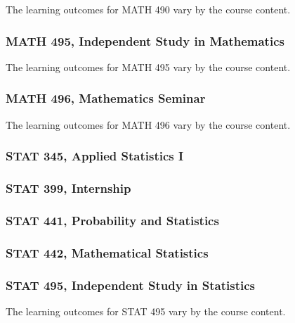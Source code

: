The learning outcomes for MATH 490 vary by the course content.

\subsubsection*{MATH 495, Independent Study in Mathematics}


The learning outcomes for MATH 495 vary by the course content.

\subsubsection*{MATH 496, Mathematics Seminar}

The learning outcomes for MATH 496 vary by the course content.


\subsubsection*{STAT 345, Applied Statistics I}

\subsubsection*{STAT 399, Internship}

\subsubsection*{STAT 441, Probability and Statistics}

\subsubsection*{STAT 442, Mathematical Statistics}

\subsubsection*{STAT 495, Independent Study in Statistics}

The learning outcomes for STAT 495 vary by the course content.




